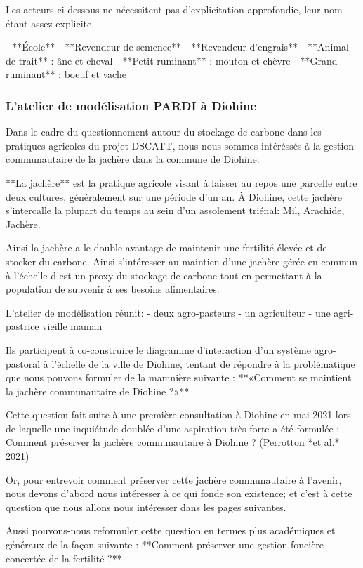 Les acteurs ci-dessous ne nécessitent pas d'explicitation approfondie, leur nom étant assez explicite.

- **École**
- **Revendeur de semence**
- **Revendeur d'engrais**
- **Animal de trait** : âne et cheval
- **Petit ruminant** : mouton et chèvre
- **Grand ruminant** : boeuf et vache

\subsubsection{L'atelier de modélisation PARDI à Diohine }

Dans le cadre du questionnement autour du stockage de carbone dans les pratiques agricoles du projet DSCATT, nous nous sommes intéréssés à la gestion communautaire de la jachère dans la commune de Diohine. 

**La jachère** est la pratique agricole visant à laisser au repos une parcelle entre deux cultures, généralement sur une période d'un an. À Diohine, cette jachère s'intercalle la plupart du temps au sein d'un assolement triénal: Mil, Arachide, Jachère.

Ainsi la jachère a le double avantage de maintenir une fertilité élevée et de stocker du carbone. Ainsi s'intéresser au maintien d'une jachère gérée en commun à l'échelle d est un proxy du stockage de carbone tout en permettant à la population de subvenir à ses besoins alimentaires.

L'atelier de modélisation réunit:
- deux agro-pasteurs
- un agriculteur
- une agri-pastrice vieille maman 

Ils participent à co-construire le diagramme d'interaction d'un système agro-pastoral à l'échelle de la ville de Diohine, tentant de répondre à la problématique que nous pouvons formuler de la mamnière suivante : **«Comment se maintient la jachère communautaire de Diohine ?»**

Cette question fait suite à une première consultation à Diohine en mai 2021 lors de laquelle une inquiétude doublée d'une aspiration très forte a été formulée : Comment préserver la jachère communautaire à Diohine ? (Perrotton *et al.* 2021) 

Or, pour entrevoir comment préserver cette jachère communautaire à l'avenir, nous devons d'abord nous intéresser à ce qui fonde son existence; et c'est à cette question que nous allons nous intéresser dans les pages suivantes. 


Aussi pouvons-nous reformuler cette question en termes plus académiques et généraux de la façon suivante :  
**Comment préserver une gestion foncière concertée de la fertilité ?**

